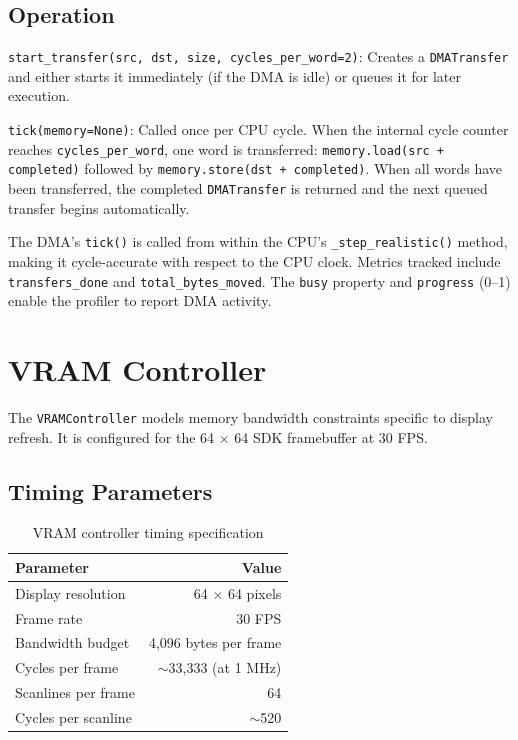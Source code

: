 \documentclass[10pt,a4paper,twoside]{book}
\begin{document}
\subsection{Operation}

\noindent\texttt{start\_transfer(src, dst, size, cycles\_per\_word=2)}:
Creates a \texttt{DMATransfer} and either starts it immediately (if the DMA
is idle) or queues it for later execution.

\noindent\texttt{tick(memory=None)}: Called once per CPU cycle. When the
internal cycle counter reaches \texttt{cycles\_per\_word}, one word is
transferred: \texttt{memory.load(src + completed)} followed by
\texttt{memory.store(dst + completed)}. When all words have been
transferred, the completed \texttt{DMATransfer} is returned and the next
queued transfer begins automatically.

The DMA's \texttt{tick()} is called from within the CPU's
\texttt{\_step\_realistic()} method, making it cycle-accurate with respect
to the CPU clock. Metrics tracked include \texttt{transfers\_done} and
\texttt{total\_bytes\_moved}. The \texttt{busy} property and
\texttt{progress} (0--1) enable the profiler to report DMA activity.

\section{VRAM Controller}

The \texttt{VRAMController} models memory bandwidth constraints specific to
display refresh. It is configured for the 64 $\times$ 64 SDK framebuffer at
30 FPS.

\subsection{Timing Parameters}

\begin{table}[H]
\centering
\caption{VRAM controller timing specification}
\label{tab:vramparams}
\begin{tabular}{lr}
\toprule
Parameter & Value \\
\midrule
Display resolution & 64 $\times$ 64 pixels \\
Frame rate & 30 FPS \\
Bandwidth budget & 4,096 bytes per frame \\
Cycles per frame & $\sim$33,333 (at 1 MHz) \\
Scanlines per frame & 64 \\
Cycles per scanline & $\sim$520 \\
\bottomrule
\end{tabular}
\end{table}
\end{document}
